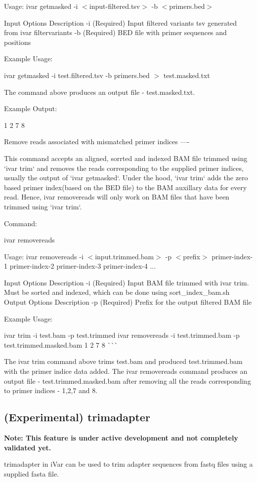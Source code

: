 Usage\+: ivar getmasked -\/i $<$input-\/filtered.\+tsv$>$ -\/b $<$primers.\+bed$>$

Input Options Description -\/i (Required) Input filtered variants tsv generated from ivar filtervariants -\/b (Required) B\+ED file with primer sequences and positions


\begin{DoxyCode}
Example Usage:
\end{DoxyCode}
 ivar getmasked -\/i test.\+filtered.\+tsv -\/b primers.\+bed $>$ test.\+masked.\+txt 
\begin{DoxyCode}
The command above produces an output file - test.masked.txt.

Example Output:
\end{DoxyCode}
 1 2 7 8 
\begin{DoxyCode}
Remove reads associated with mismatched primer indices
----

This command accepts an aligned, sorrted and indexed BAM file trimmed using `ivar trim` and removes the
       reads corresponding to the supplied primer indices, usually the output of `ivar getmasked`. Under the hood,
       `ivar trim` adds the zero based primer index(based on the BED file) to the BAM auxillary data for every read.
       Hence, ivar removereads will only work on BAM files that have been trimmed using `ivar trim`.

Command:
\end{DoxyCode}
 ivar removereads

Usage\+: ivar removereads -\/i $<$input.\+trimmed.\+bam$>$ -\/p $<$prefix$>$ primer-\/index-\/1 primer-\/index-\/2 primer-\/index-\/3 primer-\/index-\/4 ...

Input Options Description -\/i (Required) Input B\+AM file trimmed with ivar trim. Must be sorted and indexed, which can be done using sort\+\_\+index\+\_\+bam.\+sh Output Options Description -\/p (Required) Prefix for the output filtered B\+AM file


\begin{DoxyCode}
Example Usage:
\end{DoxyCode}
 ivar trim -\/i test.\+bam -\/p test.\+trimmed ivar removereads -\/i test.\+trimmed.\+bam -\/p test.\+trimmed.\+masked.\+bam 1 2 7 8 \`{}\`{}\`{}

The {\ttfamily ivar trim} command above trims test.\+bam and produced test.\+trimmed.\+bam with the primer indice data added. The {\ttfamily ivar removereads} command produces an output file -\/ test.\+trimmed.\+masked.\+bam after removing all the reads corresponding to primer indices -\/ 1,2,7 and 8.\hypertarget{manualpage_autotoc_md6}{}\subsection{(\+Experimental) trimadapter}\label{manualpage_autotoc_md6}
{\bfseries Note\+: This feature is under active development and not completely validated yet.}

trimadapter in i\+Var can be used to trim adapter sequences from fastq files using a supplied fasta file. 